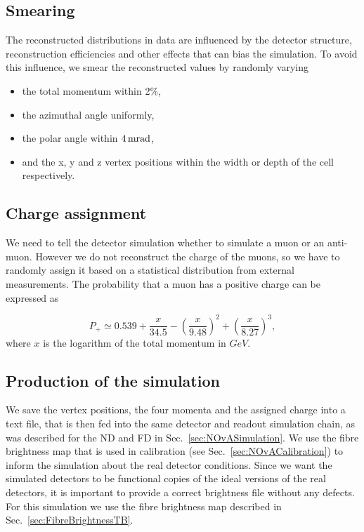 \subsection*{Smearing}
The reconstructed distributions in data are influenced by the detector structure, reconstruction efficiencies and other effects that can bias the simulation. To avoid this influence, we smear the reconstructed values by randomly varying
\begin{itemize}
\item the total momentum within 2\%,
\item the azimuthal angle uniformly,
\item the polar angle within $\unit[4]{mrad}$,
\item and the x, y and z vertex positions within the width or depth of the cell respectively.
\end{itemize}

\subsection*{Charge assignment}
We need to tell the detector simulation whether to simulate a muon or an anti-muon. However we do not reconstruct the charge of the muons, so we have to randomly assign it based on a statistical distribution from external measurements. The probability that a muon has a positive charge can be expressed as \cite{NOvA-doc-51327} 


\begin{equation}
P_+ \simeq 0.539 + \frac{x}{34.5}-\left(\frac{x}{9.48}\right)^2 + \left(\frac{x}{8.27}\right)^3,
\end{equation}
where $x$ is the logarithm of the total momentum in $\unit{GeV}$.

\subsection*{Production of the simulation}
We save the vertex positions, the four momenta and the assigned charge into a text file, that is then fed into the same detector and readout simulation chain, as was described for the \gls{ND} and \gls{FD} in Sec.~\ref{sec:NOvASimulation}.  We use the fibre brightness map that is used in calibration (see Sec.~\ref{sec:NOvACalibration}) to inform the simulation about the real detector conditions. Since we want the simulated detectors to be functional copies of the ideal versions of the real detectors, it is important to provide a correct brightness file without any defects. For this simulation we use the fibre brightness map described in Sec.~\ref{sec:FibreBrightnessTB}.

